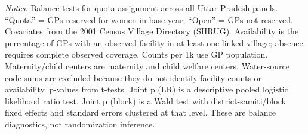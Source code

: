 \begin{table}[htbp]
\vspace{0.5ex}
\parbox{\linewidth}{\scriptsize \emph{Notes:} Balance tests for quota assignment across all Uttar Pradesh panels. ``Quota'' = GPs reserved for women in base year; ``Open'' = GPs not reserved. Covariates from the 2001 Census Village Directory (SHRUG). Availability is the percentage of GPs with an observed facility in at least one linked village; absence requires complete observed coverage. Counts per 1k use GP population. Maternity/child centers are maternity and child welfare centers. Water-source code sums are excluded because they do not identify facility counts or availability. p-values from t-tests. Joint p (LR) is a descriptive pooled logistic likelihood ratio test. Joint p (block) is a Wald test with district-samiti/block fixed effects and standard errors clustered at that level. These are balance diagnostics, not randomization inference.}
\end{table}
